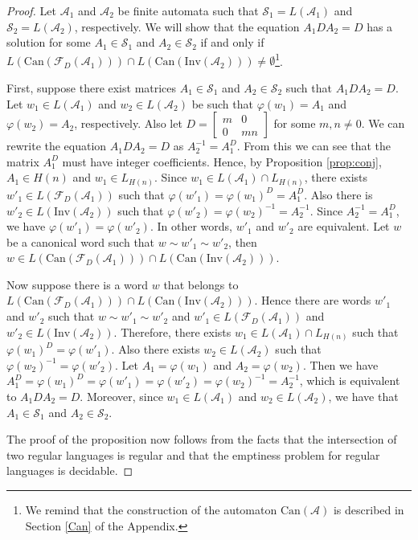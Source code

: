 \documentclass[fontsize=11pt,DIV=13,paper=letter]{scrartcl}
\theoremstyle{definition}
\newcommand{\A}{\mathcal{A}}
\newcommand{\F}{\mathcal{F}}
\newcommand{\s}{\mathcal{S}}
\renewcommand{\phi}{\varphi}
\begin{document}
\begin{proof}
Let $\A_1$ and $\A_2$ be finite automata such that $\s_1=L(\A_1)$ and $\s_2=L(\A_2)$, respectively. We will show that the equation $A_1DA_2=D$ has a solution for some $A_1\in \s_1$ and $A_2\in \s_2$ if and only if $L(\mathrm{Can}(\F_D(\A_1)))\cap L(\mathrm{Can}(\mathrm{Inv}(\A_2))) \neq \emptyset$\footnote{We remind that the construction of the automaton $\mathrm{Can}(\A)$ is described in Section \ref{Can} of the Appendix.}.

First, suppose there exist matrices $A_1\in \s_1$ and $A_2\in \s_2$ such that $A_1DA_2=D$. Let $w_1\in L(\A_1)$ and $w_2\in L(\A_2)$ be such that $\phi(w_1)=A_1$ and $\phi(w_2)=A_2$, respectively. Also let $D=\begin{bmatrix} m & 0\\ 0 & mn\end{bmatrix}$ for some $m,n\neq 0$. We can rewrite the equation $A_1DA_2=D$ as $A_2^{-1}=A_1^D$. From this we can see that the matrix $A_1^D$ must have integer coefficients. Hence, by Proposition \ref{prop:conj}, $A_1\in H(n)$ and $w_1\in L_{H(n)}$. Since $w_1\in L(\A_1)\cap L_{H(n)}$, there exists $w'_1\in L(\F_D(\A_1))$ such that $\phi(w'_1)=\phi(w_1)^D=A_1^D$. Also there is $w'_2\in L(\mathrm{Inv}(\A_2))$ such that $\phi(w'_2)=\phi(w_2)^{-1}=A_2^{-1}$. Since $A_2^{-1}=A_1^D$, we have $\phi(w'_1)=\phi(w'_2)$. In other words, $w'_1$ and $w'_2$ are equivalent. Let $w$ be a canonical word such that $w\sim w'_1\sim w'_2$, then $w\in L(\mathrm{Can}(\F_D(\A_1)))\cap L(\mathrm{Can}(\mathrm{Inv}(\A_2)))$.

Now suppose there is a word $w$ that belongs to $L(\mathrm{Can}(\F_D(\A_1)))\cap L(\mathrm{Can}(\mathrm{Inv}(\A_2)))$. Hence there are words $w'_1$ and $w'_2$ such that $w\sim w'_1\sim w'_2$ and $w'_1\in L(\F_D(\A_1))$ and $w'_2\in L(\mathrm{Inv}(\A_2))$. Therefore, there exists $w_1\in L(\A_1)\cap L_{H(n)}$ such that $\phi(w_1)^D=\phi(w'_1)$. Also there exists $w_2\in L(\A_2)$ such that $\phi(w_2)^{-1} = \phi(w'_2)$. Let $A_1=\phi(w_1)$ and $A_2=\phi(w_2)$. Then we have $A_1^D=\phi(w_1)^D=\phi(w'_1)=\phi(w'_2)=\phi(w_2)^{-1}=A_2^{-1}$, which is equivalent to $A_1DA_2=D$. Moreover, since $w_1\in L(\A_1)$ and $w_2\in L(\A_2)$, we have that $A_1\in \s_1$ and $A_2\in \s_2$.

The proof of the proposition now follows from the facts that the intersection of two regular languages is regular and that the emptiness problem for regular languages is decidable.
\end{proof}
\end{document}
